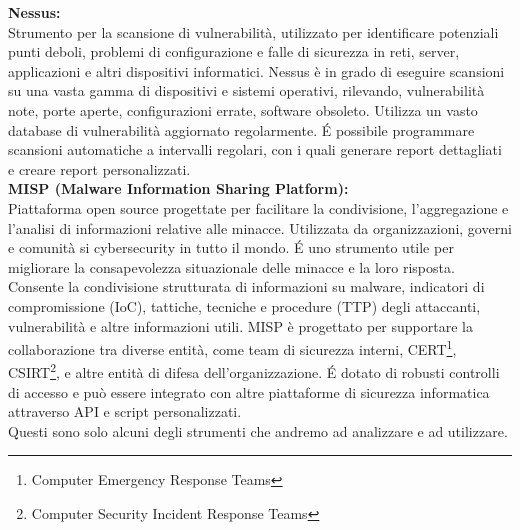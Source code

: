 \textbf{Nessus:}\\
Strumento per la scansione di vulnerabilità, utilizzato per identificare potenziali punti deboli, problemi di configurazione e falle di sicurezza in reti, server, applicazioni e altri dispositivi informatici.
Nessus è in grado di eseguire scansioni su una vasta gamma di dispositivi e sistemi operativi, rilevando, vulnerabilità note, porte aperte, configurazioni errate, software obsoleto. Utilizza un vasto database di vulnerabilità aggiornato regolarmente. \'E possibile programmare scansioni automatiche a intervalli regolari, con i quali generare report dettagliati e creare report personalizzati.\\

\newpage
\textbf{MISP (Malware Information Sharing Platform):}\\
Piattaforma open source progettate per facilitare la condivisione, l'aggregazione e l'analisi di informazioni relative alle minacce. Utilizzata da organizzazioni, governi e comunità si cybersecurity in tutto il mondo. \'E uno strumento utile per migliorare la consapevolezza situazionale delle minacce e la loro risposta.
Consente la condivisione strutturata di informazioni su malware, indicatori di compromissione (IoC), tattiche, tecniche e procedure (TTP) degli attaccanti, vulnerabilità e altre informazioni utili.
MISP è progettato per supportare la collaborazione tra diverse entità, come team di sicurezza interni, CERT\footnote{Computer Emergency Response Teams}, CSIRT\footnote{Computer Security Incident Response Teams}, e altre entità di difesa dell'organizzazione.
\'E dotato di robusti controlli di accesso e può essere integrato con altre piattaforme di sicurezza informatica attraverso API e script personalizzati.\\


Questi sono solo alcuni degli strumenti che andremo ad analizzare e ad utilizzare.

